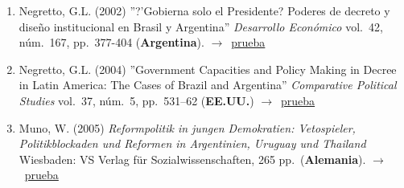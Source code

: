 \documentclass[12 pt, letter]{article}
\newenvironment{CitasMiTrabajo}{
    \begin{footnotesize}
    \begin{enumerate}[label={\footnotesize\emph{cita~\arabic*}},ref=\arabic*] %
        \setlength{\itemsep}{.1\itemsep}
        \setlength{\parskip}{.1\parskip}
    }{\end{enumerate}\end{footnotesize}}
\begin{document}
        \begin{CitasMiTrabajo}

        \item Negretto, G.L. (2002)
        ''?'Gobierna solo el Presidente? Poderes de decreto y dise\~no institucional en Brasil y Argentina'' \emph{Desarrollo Econ\'omico}
        vol.\ 42, n\'um.\ 167, pp.\ 377-404 (\textbf{Argentina}). $\rightarrow$~\href{http://ericmagar.com/cv/cites/decreeArg/negre2.pdf}{prueba}

        \item Negretto, G.L. (2004)
        ''Government Capacities and Policy Making in
        Decree in Latin America: The Cases of Brazil and Argentina''
        \emph{Comparative Political Studies} vol.\ 37, n\'um.\ 5, pp.\ 531--62 (\textbf{EE.UU.}) $\rightarrow$~\href{http://ericmagar.com/cv/cites/decreeArg/negre.pdf}{prueba}

        \item Muno, W. (2005)
        \emph{Reformpolitik in jungen Demokratien:
        Vetospieler, Politikblockaden und Reformen in Argentinien, Uruguay und
        Thailand} Wiesbaden: VS Verlag f\"ur Sozialwissenschaften, 265 pp.\ (\textbf{Alemania}). $\rightarrow$~\href{http://ericmagar.com/cv/cites/decreeArg/muno.pdf}{prueba}

        \label{ncites:magarArgDecrees2001} %

        \end{CitasMiTrabajo}





\end{document}
